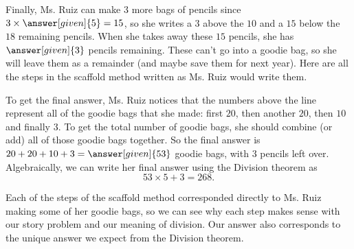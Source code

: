 \documentclass{ximera}
\begin{document}
\begin{example}
Finally, Ms. Ruiz can make $3$ more bags of pencils since $3 \times \answer[given]{5} = 15$, so she writes a $3$ above the $10$ and a $15$ below the $18$ remaining pencils. When she takes away these $15$ pencils, she has $\answer[given]{3}$ pencils remaining. These can't go into a goodie bag, so she will leave them as a remainder (and maybe save them for next year). Here are all the steps in the scaffold method written as Ms. Ruiz would write them.

\begin{image}
\end{image}


To get the final answer, Ms. Ruiz notices that the numbers above the line represent all of the goodie bags that she made: first $20$, then another $20$, then $10$ and finally $3$. To get the total number of goodie bags, she should combine (or add) all of those goodie bags together. So the final answer is $20 + 20 + 10 + 3 = \answer[given]{53}$ goodie bags, with $3$ pencils left over. Algebraically, we can write her final answer using the Division theorem as
\[
53 \times 5 + 3 = 268.
\]

Each of the steps of the scaffold method corresponded directly to Ms. Ruiz making some of her goodie bags, so we can see why each step makes sense with our story problem and our meaning of division. Our answer also corresponds to the unique answer we expect from the Division theorem.

\end{example}
\end{document}

